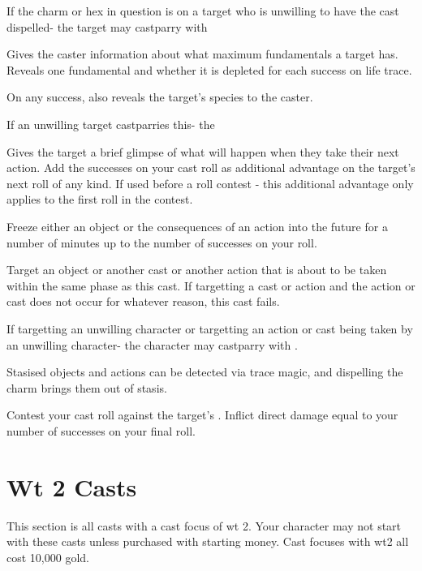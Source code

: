 \begin{GRPtablewide}
{		If the charm or hex in question is on a target who is unwilling to have the cast dispelled- the target may castparry with 
	}

	{%
		Gives the caster information about what maximum fundamentals a target has. Reveals one fundamental and whether it is depleted for each success on life trace.

		On any success, also reveals the target's species to the caster.

		If an unwilling target castparries this- the 
	}

	{%
		Gives the target a brief glimpse of what will happen when they take their next action. Add the successes on your cast roll as additional advantage on the target's next roll of any kind. If used before a roll contest - this additional advantage only applies to the first roll in the contest.
	}

	{%
		Freeze either an object or the consequences of an action into the future for a number of minutes up to the number of successes on your roll.

		Target an object or another cast or another action that is about to be taken within the same phase as this cast. If targetting a cast or action and the action or cast does not occur for whatever reason, this cast fails.

		If targetting an unwilling character or targetting an action or cast being taken by an unwilling character- the character may castparry with .

		Stasised objects and actions can be detected via trace magic, and dispelling the charm brings them out of stasis.
	}

	{%
		Contest your cast roll against the target's . Inflict direct damage equal to your number of successes on your final roll.
	}
\end{GRPtablewide}



\section{Wt 2 Casts}

This section is all casts with a cast focus of wt 2. Your character may not start with these casts unless purchased with starting money. Cast focuses with wt2 all cost 10,000 gold.


